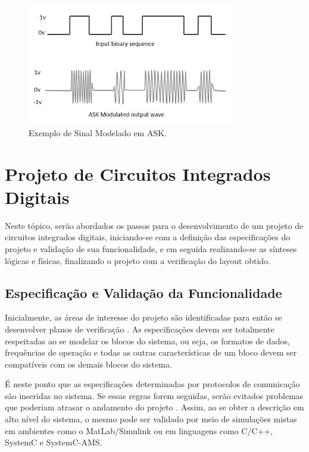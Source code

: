 \begin{figure}[ht!]
  \centering
  \includegraphics[width=0.8\textwidth]{figuras/ask.jpg}
  \caption{Exemplo de Sinal Modelado em ASK.}
  \label{ask}
\end{figure}


\chapter{Projeto de Circuitos Integrados Digitais}

Neste tópico, serão abordados os passos para o desenvolvimento de um projeto de circuitos integrados digitais, iniciando-se com a definição das especificações do projeto e validação de sua funcionalidade, e em seguida realizando-se as sínteses lógicas e físicas, finalizando o projeto com a verificação do layout obtido.

\section{Especificação e Validação da Funcionalidade}

Inicialmente, as áreas de interesse do projeto são identificadas para então se desenvolver planos de verificação \cite{Marlon}. As especificações devem ser totalmente respeitadas ao se modelar os blocos do sistema, ou seja, os formatos de dados, frequências de operação e todas as outras características de um bloco devem ser compatíveis com os demais blocos do sistema.

É neste ponto que as especificações determinadas por protocolos de comunicação são inseridas no sistema. Se essas regras forem seguidas, serão evitados problemas que poderiam atrasar o andamento do projeto  \cite{Marlon}. Assim, ao se obter a descrição em alto nível do sistema, o mesmo pode ser validado por meio de simulações mistas em ambientes como o MatLab/Simulink ou em linguagens como C/C++, SystemC e SystemC-AMS.

